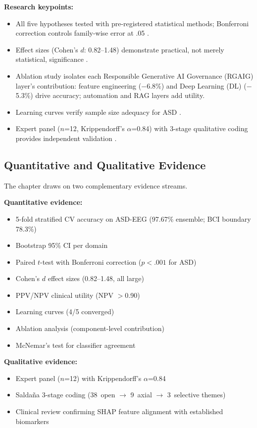 \noindent\textbf{Research keypoints:}
\begin{itemize}[leftmargin=*, itemsep=3pt]
    \item All five hypotheses tested with pre-registered statistical methods; Bonferroni correction controls family-wise error at .05 \cite{cohen1988statistical}.
    \item Effect sizes (Cohen's $d$: 0.82--1.48) demonstrate practical, not merely statistical, significance \cite{cohen1988statistical}.
    \item Ablation study isolates each Responsible Generative AI Governance (RGAIG) layer's contribution: feature engineering ($-$6.8\%) and Deep Learning (DL) ($-$5.3\%) drive accuracy; automation and RAG layers add utility.
    \item Learning curves verify sample size adequacy for ASD \cite{kohavi1995crossvalidation}.
    \item Expert panel ($n$=12, Krippendorff's $\alpha$=0.84) with 3-stage qualitative coding provides independent validation \cite{krippendorff2011computing,saldana2021coding}.
\end{itemize}


\subsection{Quantitative and Qualitative Evidence}

The chapter draws on two complementary evidence streams.

\noindent\textbf{Quantitative evidence:}
\begin{itemize}[leftmargin=*, itemsep=3pt]
    \item 5-fold stratified CV accuracy on ASD-EEG (97.67\% ensemble; BCI boundary 78.3\%)
    \item Bootstrap 95\% CI per domain
    \item Paired $t$-test with Bonferroni correction ($p<.001$ for ASD)
    \item Cohen's $d$ effect sizes (0.82--1.48, all large)
    \item PPV/NPV clinical utility (NPV $>$0.90)
    \item Learning curves (4/5 converged)
    \item Ablation analysis (component-level contribution)
    \item McNemar's test for classifier agreement
\end{itemize}

\noindent\textbf{Qualitative evidence:}
\begin{itemize}[leftmargin=*, itemsep=3pt]
    \item Expert panel ($n$=12) with Krippendorff's $\alpha$=0.84
    \item Salda\~{n}a 3-stage coding (38~open $\to$ 9~axial $\to$ 3~selective themes)
    \item Clinical review confirming SHAP feature alignment with established biomarkers
\end{itemize}

